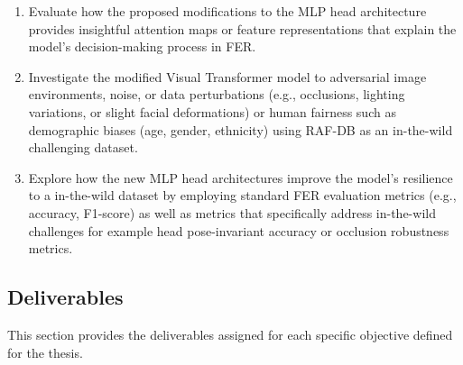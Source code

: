 \begin{enumerate}
	\item Evaluate how the proposed modifications to the MLP head architecture provides insightful attention maps or feature representations that explain the model's decision-making process in FER.
	
\item Investigate the modified Visual Transformer model to adversarial image environments, noise, or data perturbations (e.g., occlusions, lighting variations, or slight facial deformations) or human fairness such as demographic biases (age, gender, ethnicity) using RAF-DB as an in-the-wild challenging dataset. 
	
\item Explore how the new MLP head architectures improve the model’s resilience to a in-the-wild dataset by employing standard FER evaluation metrics (e.g., accuracy, F1-score) as well as metrics that specifically address in-the-wild challenges for example head pose-invariant accuracy  or occlusion robustness metrics.
	
\end{enumerate}

\subsection{Deliverables}

This section provides the deliverables assigned for each specific objective defined for the thesis.



